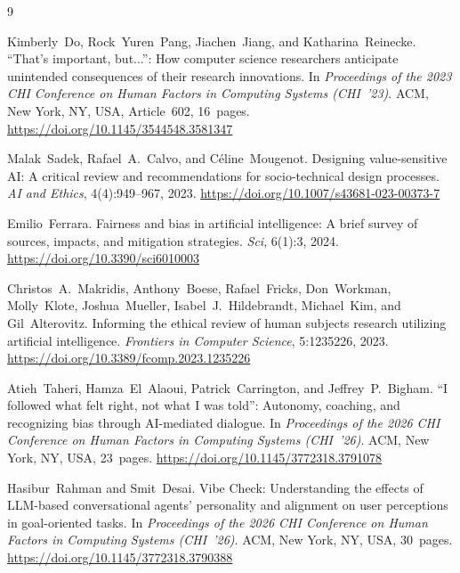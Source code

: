 \documentclass[manuscript,screen]{acmart}
\begin{document}
\begin{thebibliography}{9}

Kimberly~Do, Rock~Yuren~Pang, Jiachen~Jiang, and Katharina~Reinecke.
\newblock ``That's important, but...'': How computer science researchers anticipate
unintended consequences of their research innovations.
\newblock In \emph{Proceedings of the 2023 CHI Conference on Human Factors in
Computing Systems (CHI~'23)}. ACM, New York, NY, USA, Article~602, 16~pages.
\newblock \url{https://doi.org/10.1145/3544548.3581347}

Malak~Sadek, Rafael~A.~Calvo, and C\'{e}line~Mougenot.
\newblock Designing value-sensitive AI: A critical review and recommendations for
socio-technical design processes.
\newblock \emph{AI and Ethics}, 4(4):949--967, 2023.
\newblock \url{https://doi.org/10.1007/s43681-023-00373-7}

Emilio~Ferrara.
\newblock Fairness and bias in artificial intelligence: A brief survey of sources,
impacts, and mitigation strategies.
\newblock \emph{Sci}, 6(1):3, 2024.
\newblock \url{https://doi.org/10.3390/sci6010003}

Christos~A.~Makridis, Anthony~Boese, Rafael~Fricks, Don~Workman, Molly~Klote,
Joshua~Mueller, Isabel~J.~Hildebrandt, Michael~Kim, and Gil~Alterovitz.
\newblock Informing the ethical review of human subjects research utilizing
artificial intelligence.
\newblock \emph{Frontiers in Computer Science}, 5:1235226, 2023.
\newblock \url{https://doi.org/10.3389/fcomp.2023.1235226}

Atieh~Taheri, Hamza~El~Alaoui, Patrick~Carrington, and Jeffrey~P.~Bigham.
\newblock ``I followed what felt right, not what I was told'': Autonomy, coaching,
and recognizing bias through AI-mediated dialogue.
\newblock In \emph{Proceedings of the 2026 CHI Conference on Human Factors in
Computing Systems (CHI~'26)}. ACM, New York, NY, USA, 23~pages.
\newblock \url{https://doi.org/10.1145/3772318.3791078}

Hasibur~Rahman and Smit~Desai.
\newblock Vibe Check: Understanding the effects of LLM-based conversational agents'
personality and alignment on user perceptions in goal-oriented tasks.
\newblock In \emph{Proceedings of the 2026 CHI Conference on Human Factors in
Computing Systems (CHI~'26)}. ACM, New York, NY, USA, 30~pages.
\newblock \url{https://doi.org/10.1145/3772318.3790388}


\end{thebibliography}
\end{document}
